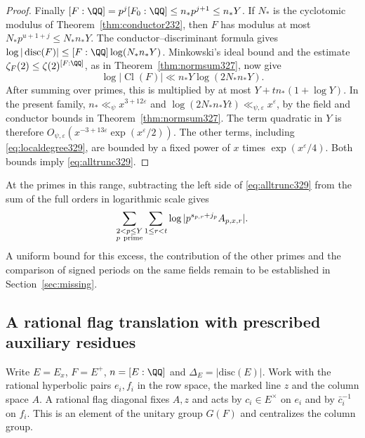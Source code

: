 \documentclass[a4paper,11pt]{article}
\theoremstyle{definition}
\theoremstyle{remark}
\numberwithin{equation}{section}
\newcommand{\Cl}{\operatorname{Cl}}
\begin{document}
\begin{proof}
Finally \([F:\QQ]=p^j[F_0:\QQ]\le n_*p^{j+1}\le n_*Y\). If
\(N_*\) is the cyclotomic modulus of Theorem~\ref{thm:conductor232},
then \(F\) has modulus at most \(N_*p^{u+1+j}\le N_*n_*Y\).
The conductor--discriminant formula gives
\(\log|\operatorname{disc}(F)|\le [F:\QQ]\log(N_*n_*Y)\).
Minkowski's ideal bound and the estimate
\(\zeta_F(2)\le\zeta(2)^{[F:\QQ]}\), as in
Theorem~\ref{thm:normsum327}, now give
\[
 \log|\Cl(F)|\ll n_*Y\log(2N_*n_*Y).
\]
After summing over primes, this is multiplied by at most
\(Y+tn_*(1+\log Y)\). In the present family,
\(n_*\ll_\psi x^{3+12\varepsilon}\) and
\(\log(2N_*n_*Yt)\ll_{\psi,\varepsilon}x^\varepsilon\), by the
field and conductor bounds in Theorem~\ref{thm:normsum327}.
The term quadratic in \(Y\) is therefore
\(O_{\psi,\varepsilon}(x^{-3+13\varepsilon}\exp(x^\varepsilon/2))\).
The other terms, including \eqref{eq:localdegree329}, are bounded
by a fixed power of \(x\) times \(\exp(x^\varepsilon/4)\).
Both bounds imply \eqref{eq:alltrunc329}.
\end{proof}

At the primes in this range, subtracting the left side of
\eqref{eq:alltrunc329} from the sum of the full orders in logarithmic
scale gives
\[
 \sum_{\substack{2<p\le Y\\p\ {\rm prime}}}
 \sum_{1\le r<t}\log|p^{s_{p,r}+j_p}A_{p,x,r}|.
\]
A uniform bound for this excess, the contribution of the other primes
and the comparison of signed periods on the same fields remain to be
established in Section~\ref{sec:missing}.


\subsection{A rational flag translation with prescribed auxiliary residues}\label{sec:rationalflag342}
Write $E=E_x$, $F=E^+$, $n=[E:\QQ]$ and $\Delta_E=|\mathrm{disc}(E)|$.
Work with the rational hyperbolic pairs $e_i,f_i$ in the row space,
the marked line $z$ and the column space $A$. A rational flag
diagonal fixes $A,z$ and acts by $c_i\in E^\times$ on $e_i$ and by
$\bar c_i^{-1}$ on $f_i$. This is an element of the unitary group
$G(F)$ and centralizes the column group.
\end{document}
